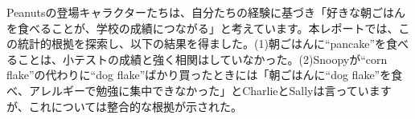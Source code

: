 \documentclass[xelatex,ja=standard]{bxjsarticle}
\begin{document}


Peanutsの登場キャラクターたちは、自分たちの経験に基づき「好きな朝ごはんを食べることが、学校の成績につながる」と考えています。本レポートでは、この統計的根拠を探索し、以下の結果を得ました。(1)朝ごはんに``pancake''を食べることは、小テストの成績と強く相関はしていなかった。(2)Snoopyが``corn flake''の代わりに``dog flake''ばかり買ったときには「朝ごはんに``dog flake''を食べ、アレルギーで勉強に集中できなかった」とCharlieとSallyは言っていますが、これについては整合的な根拠が示された。




 

\end{document}
